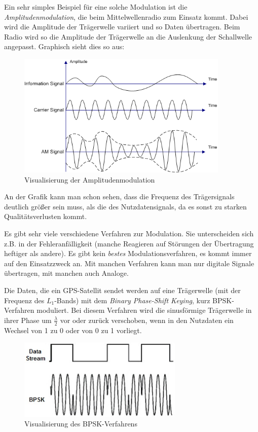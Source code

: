 \documentclass[12pt,a4paper]{scrartcl}
\begin{document}
Ein sehr simples Beispiel für eine solche Modulation ist die \emph{Amplitudenmodulation}, die beim Mittelwellenradio zum Einsatz kommt. Dabei wird die Amplitude der Trägerwelle variiert und so Daten übertragen. Beim Radio wird so die Amplitude der Trägerwelle an die Auslenkung der Schallwelle angepasst. Graphisch sieht dies so aus:

\begin{figure}[H]
\centering
\includegraphics[width=0.9\textwidth]{img/Illustration_of_Amplitude_Modulation.png}
\caption{Visualisierung der Amplitudenmodulation\cite{commons_am}}
\label{fig:am}
\end{figure}

An der Grafik kann man schon sehen, dass die Frequenz des Trägersignals deutlich größer sein muss, als die des Nutzdatensignals, da es sonst zu starken Qualitätsverlusten kommt.

Es gibt sehr viele verschiedene Verfahren zur Modulation. Sie unterscheiden sich z.B. in der Fehleranfälligkeit (manche Reagieren auf Störungen der Übertragung heftiger als andere). Es gibt kein \emph{bestes} Modulationsverfahren, es kommt immer auf den Einsatzzweck an. Mit manchen Verfahren kann man nur digitale Signale übertragen, mit manchen auch Analoge.

Die Daten, die ein GPS-Satellit sendet werden auf eine Trägerwelle (mit der Frequenz des $L_1$-Bands) mit dem \emph{Binary Phase-Shift Keying}, kurz BPSK-Verfahren moduliert.
Bei diesem Verfahren wird die sinusförmige Trägerwelle in ihrer Phase um $\frac{\lambda}{2}$ vor oder zurück verschoben, wenn in den Nutzdaten ein Wechsel von 1 zu 0 oder von 0 zu 1 vorliegt.

\begin{figure}[H]
\centering
\includegraphics[width=0.7\textwidth]{img/bpsk.jpg}
\caption{Visualisierung des BPSK-Verfahrens\cite{evalidate_bpsk}}
\label{fig:am}
\end{figure}
\end{document}
